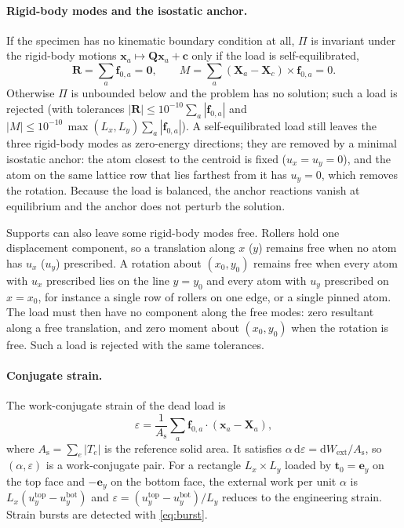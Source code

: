 \documentclass[11pt,a4paper]{article}
\newcommand{\x}{\mathbf x}
\newcommand{\X}{\mathbf X}
\newcommand{\f}{\mathbf f}
\begin{document}
\paragraph{Rigid-body modes and the isostatic anchor.}
If the specimen has no kinematic boundary condition at all, \(\Pi\) is invariant under the
rigid-body motions \(\x_a\mapsto\mathbf Q\x_a+\mathbf c\) only if the load is self-equilibrated,
\begin{equation}
  \mathbf R=\sum_a\f_{0,a}=\mathbf 0,\qquad
  M=\sum_a(\X_a-\X_c)\times\f_{0,a}=0 .
\end{equation}
Otherwise \(\Pi\) is unbounded below and the problem has no solution; such a load is rejected
(with tolerances \(|\mathbf R|\le10^{-10}\sum_a|\f_{0,a}|\) and
\(|M|\le10^{-10}\,\max(L_x,L_y)\sum_a|\f_{0,a}|\)). A self-equilibrated load still leaves the three
rigid-body modes as zero-energy directions; they are removed by a minimal isostatic anchor: the
atom closest to the centroid is fixed (\(u_x=u_y=0\)), and the atom on the same lattice row that
lies farthest from it has \(u_y=0\), which removes the rotation. Because the load is balanced, the
anchor reactions vanish at equilibrium and the anchor does not perturb the solution.

Supports can also leave some rigid-body modes free. Rollers hold one displacement component, so a
translation along \(x\) (\(y\)) remains free when no atom has \(u_x\) (\(u_y\)) prescribed. A rotation
about \((x_0,y_0)\) remains free when every atom with \(u_x\) prescribed lies on the line \(y=y_0\) and
every atom with \(u_y\) prescribed on \(x=x_0\), for instance a single row of rollers on one edge, or
a single pinned atom. The load must then have no component along the free modes: zero resultant
along a free translation, and zero moment about \((x_0,y_0)\) when the rotation is free. Such a
load is rejected with the same tolerances.

\paragraph{Conjugate strain.}
The work-conjugate strain of the dead load is
\begin{equation}
  \varepsilon=\frac{1}{A_{\mathrm{s}}}\sum_a\f_{0,a}\cdot(\x_a-\X_a),
  \label{eq:epsT}
\end{equation}
where \(A_{\mathrm s}=\sum_e|T_e|\) is the reference solid area. It satisfies
\(\alpha\,\mathrm d\varepsilon=\mathrm dW_{\mathrm{ext}}/A_{\mathrm s}\), so \((\alpha,\varepsilon)\) is a
work-conjugate pair. For a rectangle \(L_x\times L_y\) loaded by \(\mathbf t_0=\mathbf e_y\) on the
top face and \(-\mathbf e_y\) on the bottom face, the external work per unit \(\alpha\) is
\(L_x(u^{\mathrm{top}}_y-u^{\mathrm{bot}}_y)\) and \(\varepsilon=(u^{\mathrm{top}}_y-u^{\mathrm{bot}}_y)/L_y\)
reduces to the engineering strain. Strain bursts are detected with \eqref{eq:burst}.
\end{document}

